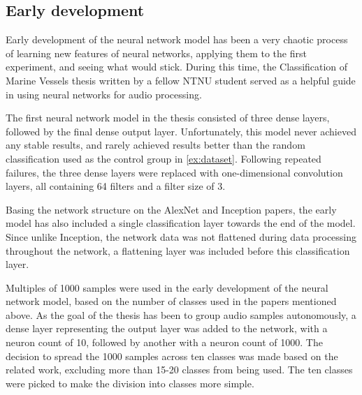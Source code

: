 \subsection{Early development}
Early development of the neural network model has been a very chaotic process of learning new features of neural networks, applying them to the first experiment, and seeing what would stick.
During this time, the Classification of Marine Vessels\cite{marine} thesis written by a fellow NTNU student served as a helpful guide in using neural networks for audio processing.

The first neural network model in the thesis consisted of three dense layers, followed by the final dense output layer.
Unfortunately, this model never achieved any stable results, and rarely achieved results better than the random classification used as the control group in \autoref{ex:dataset}.
Following repeated failures, the three dense layers were replaced with one-dimensional convolution layers, all containing 64 filters and a filter size of 3.

Basing the network structure on the AlexNet\cite{Krizhevsky:2017:ICD:3098997.3065386} and Inception\cite{szegedy2014going} papers, the early model has also included a single classification layer towards the end of the model.
Since unlike Inception, the network data was not flattened during data processing throughout the network, a flattening layer was included before this classification layer.

Multiples of 1000 samples were used in the early development of the neural network model, based on the number of classes used in the papers mentioned above.
As the goal of the thesis has been to group audio samples autonomously, a dense layer representing the output layer was added to the network, with a neuron count of 10, followed by another with a neuron count of 1000.
The decision to spread the 1000 samples across ten classes was made based on the related work\cite{ClusterExample}, excluding more than 15-20 classes from being used.
The ten classes were picked to make the division into classes more simple.


